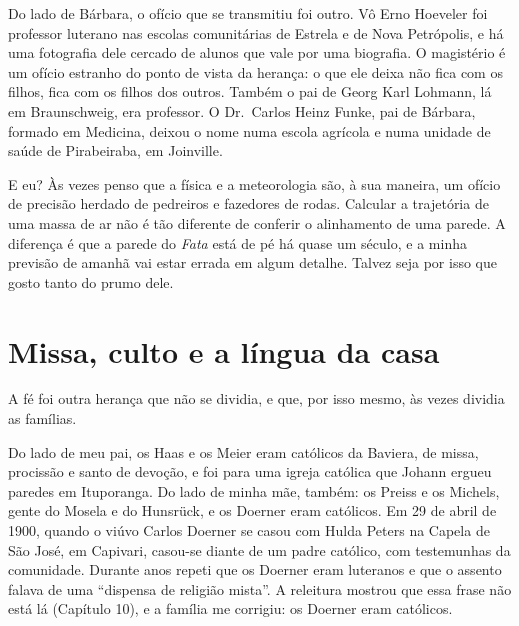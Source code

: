 \documentclass[
  brazilian,
  11pt,
  openany]{book}
\begin{document}
Do lado de Bárbara, o ofício que se transmitiu foi outro. Vô Erno
Hoeveler foi professor luterano nas escolas comunitárias de Estrela e de
Nova Petrópolis, e há uma fotografia dele cercado de alunos que vale por
uma biografia. O magistério é um ofício estranho do ponto de vista da
herança: o que ele deixa não fica com os filhos, fica com os filhos dos
outros. Também o pai de Georg Karl Lohmann, lá em Braunschweig, era
professor. O Dr.~Carlos Heinz Funke, pai de Bárbara, formado em
Medicina, deixou o nome numa escola agrícola e numa unidade de saúde de
Pirabeiraba, em Joinville.

E eu? Às vezes penso que a física e a meteorologia são, à sua maneira,
um ofício de precisão herdado de pedreiros e fazedores de rodas.
Calcular a trajetória de uma massa de ar não é tão diferente de conferir
o alinhamento de uma parede. A diferença é que a parede do \emph{Fata}
está de pé há quase um século, e a minha previsão de amanhã vai estar
errada em algum detalhe. Talvez seja por isso que gosto tanto do prumo
dele.

\section{Missa, culto e a língua da
casa}\label{missa-culto-e-a-luxedngua-da-casa}

A fé foi outra herança que não se dividia, e que, por isso mesmo, às
vezes dividia as famílias.

Do lado de meu pai, os Haas e os Meier eram católicos da Baviera, de
missa, procissão e santo de devoção, e foi para uma igreja católica que
Johann ergueu paredes em Ituporanga. Do lado de minha mãe, também: os
Preiss e os Michels, gente do Mosela e do Hunsrück, e os Doerner eram
católicos. Em 29 de abril de 1900, quando o viúvo Carlos Doerner se
casou com Hulda Peters na Capela de São José, em Capivari, casou-se
diante de um padre católico, com testemunhas da comunidade. Durante anos
repeti que os Doerner eram luteranos e que o assento falava de uma
``dispensa de religião mista''. A releitura mostrou que essa frase não
está lá (Capítulo 10), e a família me corrigiu: os Doerner eram
católicos.
\end{document}
